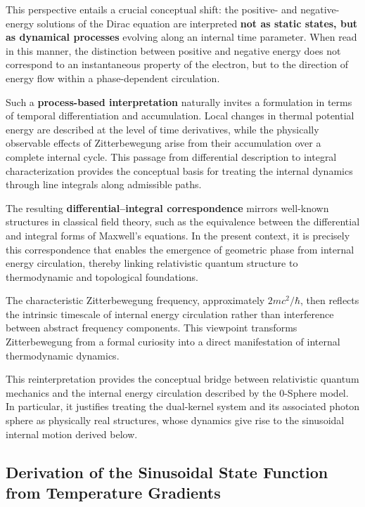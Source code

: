 \documentclass[%
 reprint,
 amsmath,amssymb,
 aps,
 prb,
]{revtex4-2}
\numberwithin{equation}{section}
\begin{document}
This perspective entails a crucial conceptual shift: the positive- and negative-energy solutions of the Dirac equation are interpreted \textbf{not as static states, but as dynamical processes} evolving along an internal time parameter.
When read in this manner, the distinction between positive and negative energy does not correspond to an instantaneous property of the electron, but to the direction of energy flow within a phase-dependent circulation.

Such a \textbf{process-based interpretation} naturally invites a formulation in terms of temporal differentiation and accumulation.
Local changes in thermal potential energy are described at the level of time derivatives, while the physically observable effects of Zitterbewegung arise from their accumulation over a complete internal cycle.
This passage from differential description to integral characterization provides the conceptual basis for treating the internal dynamics through line integrals along admissible paths.

The resulting \textbf{differential--integral correspondence} mirrors well-known structures in classical field theory, such as the equivalence between the differential and integral forms of Maxwell's equations.
In the present context, it is precisely this correspondence that enables the emergence of geometric phase from internal energy circulation, thereby linking relativistic quantum structure to thermodynamic and topological foundations.

The characteristic Zitterbewegung frequency, approximately $2mc^2/\hbar$, then reflects the intrinsic timescale of internal energy circulation rather than interference between abstract frequency components. This viewpoint transforms Zitterbewegung from a formal curiosity into a direct manifestation of internal thermodynamic dynamics.

This reinterpretation provides the conceptual bridge between relativistic quantum mechanics and the internal energy circulation described by the 0-Sphere model. In particular, it justifies treating the dual-kernel system and its associated photon sphere as physically real structures, whose dynamics give rise to the sinusoidal internal motion derived below.


\subsection{Derivation of the Sinusoidal State Function from Temperature Gradients}
\label{subsec:sinusoidal_derivation}
\end{document}
